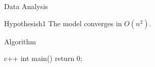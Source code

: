 \documentclass[theme=lab, aspectratio=169]{Hypo-Slide}
\begin{document}
\frame{\titlepage}

\begin{frame}{Data Analysis}
  \begin{definition}{Hypothesis}{h1}
    The model converges in $O(n^2)$.
  \end{definition}
\end{frame}

\begin{frame}[fragile]{Algorithm}
  \begin{hypocode}{c++}
    int main() {
        return 0;
    }
  \end{hypocode}
\end{frame}
\end{document}
